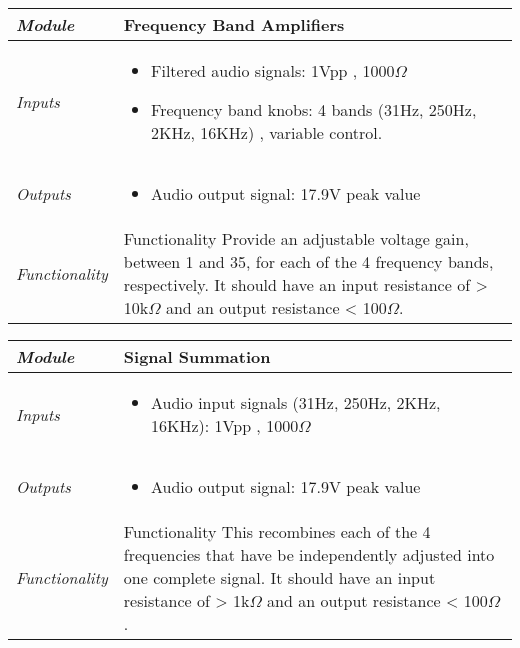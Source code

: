 \begin{enumerate}
\begin{onlysolution}
\begin{tabular}{|l|m{10cm}|}
\hline
\emph{Module} & Frequency Band Amplifiers\\ \hline
\emph{Inputs} & 
\begin{itemize}
\item Filtered audio signals: 1Vpp , 1000$\Omega$
\item Frequency band knobs: 4 bands (31Hz, 250Hz, 2KHz, 16KHz) , variable control.
\end{itemize} \\ \hline
\emph{Outputs} & 
\begin{itemize}
\item Audio output signal: 17.9V peak value
\end{itemize}  \\ \hline
\emph{Functionality} & 
Functionality Provide an adjustable voltage gain, between 1 and 35, for each of the 4
frequency bands, respectively. It should have an input resistance of > 10k$\Omega$ 
and an output resistance < 100$\Omega$. \\ \hline
\end{tabular}


\begin{tabular}{|l|m{10cm}|}
\hline
\emph{Module} & Signal Summation\\ \hline
\emph{Inputs} & 
\begin{itemize}
\item  Audio input signals (31Hz, 250Hz, 2KHz, 16KHz): 1Vpp , 1000$\Omega$
\end{itemize} \\ \hline
\emph{Outputs} &  
\begin{itemize}
\item Audio output signal: 17.9V peak value
\end{itemize}  \\ \hline
\emph{Functionality} & 
Functionality This recombines each of the 4 frequencies that have be independently
adjusted into one complete signal.  It should have an input resistance of > 1k$\Omega$ 
and an output resistance < 100$\Omega$. \\ \hline
\end{tabular}



\end{onlysolution}
\end{enumerate}

